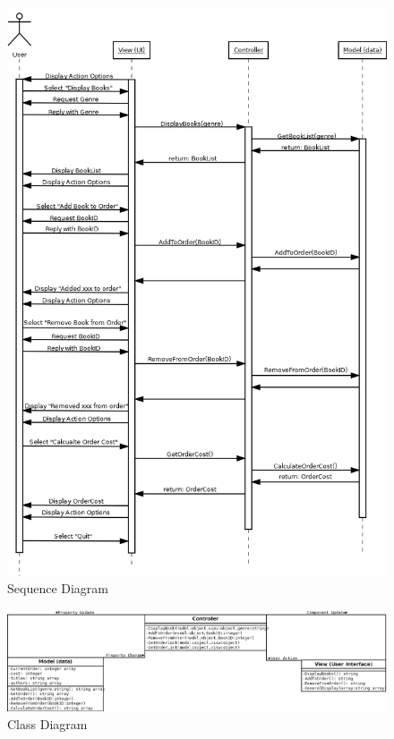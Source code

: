 \documentclass[12pt]{book}
\begin{document}
\begin{figure}
\caption{Sequence Diagram}
\includegraphics[height=\textheight]{dSequenceDiagram.png}
\end{figure}

\begin{landscape}
\begin{figure}
\caption{Class Diagram}
\includegraphics[width=1.3\textheight]{dClassDiagram.png}
\end{figure}
\end{landscape}
\end{document}
